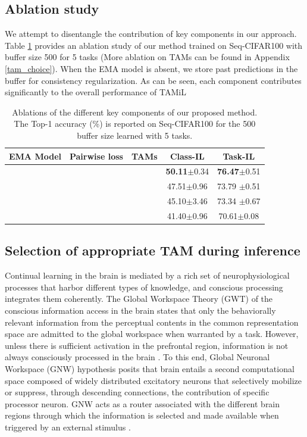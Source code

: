 \documentclass{article} %
\newcommand{\cmark}{\ding{51}}%
\newcommand{\xmark}{\ding{55}}%
\begin{document}
\subsection{Ablation study}\label{sec:ablation}
We attempt to disentangle the contribution of key components in our approach. Table \ref{tab:ablation} provides an ablation study of our method trained on Seq-CIFAR100 with buffer size 500 for 5 tasks  (More ablation on TAMs can be found in Appendix \ref{tam_choice}). When the EMA model is absent, we store past predictions in the buffer for consistency regularization. As can be seen, each component contributes significantly to the overall performance of TAMiL 

\begin{table} [h]
\centering
\caption{Ablations of the different key components of our proposed method. The Top-1 accuracy (\%) is reported on Seq-CIFAR100 for the 500 buffer size learned with 5 tasks.}
\label{tab:ablation}
\begin{tabular}{@{}ccc|c|c}
\toprule
EMA Model & Pairwise loss & TAMs & Class-IL & Task-IL \\
\midrule
\cmark & \cmark & \cmark & \textbf{50.11}\tiny{$\pm$0.34} & \textbf{76.47}\scriptsize{$\pm$0.51} \\
\xmark & \cmark & \cmark & 47.51\tiny{$\pm$0.96} & 73.79 \tiny{$\pm$0.51}\\
\xmark & \xmark & \cmark & 45.10\tiny{$\pm$3.46} & 73.34	\tiny{$\pm$0.67}  \\
\xmark & \xmark & \xmark & 41.40\tiny{$\pm$0.96} & 70.61\scriptsize{$\pm$0.08} \\
 \bottomrule
\end{tabular}%
\end{table}

\subsection{Selection of appropriate TAM during inference} \label{ignition_event_bio}
 
 Continual learning in the brain is mediated by a rich set of neurophysiological processes that harbor different types of knowledge, and conscious processing integrates them coherently. The Global Workspace Theory (GWT) \citep{baars1994global} of the conscious information access in the brain states that only the behaviorally relevant information from the perceptual contents in the common representation space are admitted to the global workspace when warranted by a task. However, unless there is sufficient activation in the prefrontal region, information is not always consciously processed in the brain  \citep{juliani2022link}. To this end, Global Neuronal Workspace (GNW) hypothesis \citep{dehaene1998neuronal} posits that brain entails a second computational space composed of widely distributed excitatory neurons that selectively mobilize or suppress, through descending connections, the contribution of specific processor neuron. GNW acts as a router associated with the different brain regions through which the information is selected and made available when triggered by an external stimulus \cite{MASHOUR2020776}. 
\end{document}
